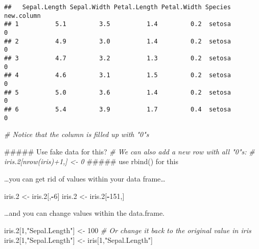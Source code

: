 \documentclass[]{article}
\newenvironment{Shaded}{\begin{snugshade}}{\end{snugshade}}
\newcommand{\DecValTok}[1]{\textcolor[rgb]{0.00,0.00,0.81}{#1}}
\newcommand{\StringTok}[1]{\textcolor[rgb]{0.31,0.60,0.02}{#1}}
\newcommand{\CommentTok}[1]{\textcolor[rgb]{0.56,0.35,0.01}{\textit{#1}}}
\newcommand{\OperatorTok}[1]{\textcolor[rgb]{0.81,0.36,0.00}{\textbf{#1}}}
\newcommand{\NormalTok}[1]{#1}
\begin{document}
\begin{verbatim}
##   Sepal.Length Sepal.Width Petal.Length Petal.Width Species new.column
## 1          5.1         3.5          1.4         0.2  setosa          0
## 2          4.9         3.0          1.4         0.2  setosa          0
## 3          4.7         3.2          1.3         0.2  setosa          0
## 4          4.6         3.1          1.5         0.2  setosa          0
## 5          5.0         3.6          1.4         0.2  setosa          0
## 6          5.4         3.9          1.7         0.4  setosa          0
\end{verbatim}

\begin{Shaded}
\begin{Highlighting}[]
\CommentTok{# Notice that the column is filled up with "0"s}

\NormalTok{##### Use fake data for this? }
\CommentTok{# We can also add a new row with all "0"s:}
\CommentTok{# iris.2[nrow(iris)+1,] <- 0}
\NormalTok{##### use rbind() for this}
\end{Highlighting}
\end{Shaded}

\ldots{}you can get rid of values within your data frame\ldots{}

\begin{Shaded}
\begin{Highlighting}[]
\NormalTok{iris.}\DecValTok{2}\NormalTok{ <-}\StringTok{ }\NormalTok{iris.}\DecValTok{2}\NormalTok{[,}\OperatorTok{-}\DecValTok{6}\NormalTok{]}
\NormalTok{iris.}\DecValTok{2}\NormalTok{ <-}\StringTok{ }\NormalTok{iris.}\DecValTok{2}\NormalTok{[}\OperatorTok{-}\DecValTok{151}\NormalTok{,]}
\end{Highlighting}
\end{Shaded}

\ldots{}and you can change values within the data.frame.

\begin{Shaded}
\begin{Highlighting}[]
\NormalTok{iris.}\DecValTok{2}\NormalTok{[}\DecValTok{1}\NormalTok{,}\StringTok{"Sepal.Length"}\NormalTok{] <-}\StringTok{ }\DecValTok{100}
\CommentTok{# Or change it back to the original value in iris}
\NormalTok{iris.}\DecValTok{2}\NormalTok{[}\DecValTok{1}\NormalTok{,}\StringTok{"Sepal.Length"}\NormalTok{] <-}\StringTok{ }\NormalTok{iris[}\DecValTok{1}\NormalTok{,}\StringTok{"Sepal.Length"}\NormalTok{]}
\end{Highlighting}
\end{Shaded}
\end{document}
